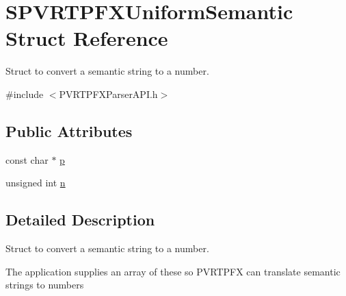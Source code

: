 \hypertarget{struct_s_p_v_r_t_p_f_x_uniform_semantic}{\section{S\+P\+V\+R\+T\+P\+F\+X\+Uniform\+Semantic Struct Reference}
\label{struct_s_p_v_r_t_p_f_x_uniform_semantic}
}


Struct to convert a semantic string to a number.  




{\ttfamily \#include $<$P\+V\+R\+T\+P\+F\+X\+Parser\+A\+P\+I.\+h$>$}

\subsection*{Public Attributes}
\begin{DoxyCompactItemize}
\item 
const char $\ast$ \hyperlink{struct_s_p_v_r_t_p_f_x_uniform_semantic_ae5a8acb56c4696af6bb8c9ea9f760b99}{p}
\item 
unsigned int \hyperlink{struct_s_p_v_r_t_p_f_x_uniform_semantic_a3b6bf5c4c8b2fa7375ea19eca40c7656}{n}
\end{DoxyCompactItemize}


\subsection{Detailed Description}
Struct to convert a semantic string to a number. 





The application supplies an array of these so P\+V\+R\+T\+P\+F\+X can translate semantic strings to numbers 

